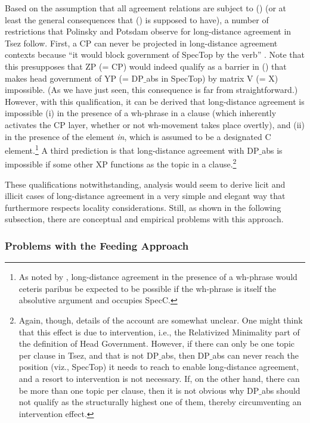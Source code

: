 \documentclass[output=paper
,modfonts
,nonflat]{langsci/langscibook}
\begin{document}
Based on the assumption that all agreement relations are subject to
(\LLast) (or at least the general consequences that (\LLast) is supposed
to have), a number of restrictions that Polinsky and Potsdam observe for
long-distance agreement in Tsez follow. First, a CP can never be
projected in long-distance agreement contexts because ``it would block
government of SpecTop by the verb''
\citep[638]{Polinsky&Potsdam:01}. Note  that this presupposes that
ZP (= CP) would indeed qualify as a barrier in (\Last) that makes
head government of YP (= DP$\_${abs} in SpecTop) by matrix V (= X)
impossible. (As we have just seen, this consequence is far from
straightforward.) However, with this qualification, it can be derived
that long-distance agreement is impossible (i) in the presence of a
wh-phrase in a clause (which inherently activates the CP layer,
whether or not wh-movement takes place overtly), and (ii) in the
presence of the element {\itshape \textcrlambda in}, which is assumed to be
a designated C element.\footnote{\label{whabs}As noted by
  \citet[fn. 20]{Polinsky&Potsdam:01}, long-distance agreement in the
  presence of a 
  wh-phrase would ceteris paribus be expected to be possible if the
  wh-phrase is itself the absolutive argument and occupies SpecC.}
 A third prediction is that long-distance
agreement with DP$\_${abs} is impossible if some other XP functions as
the topic in a clause.\footnote{Again, though, details of the account
  are somewhat unclear. One might think that this effect is due to
  intervention, i.e., the Relativized Minimality part of the
  definition of Head Government. However,  if there can only be one topic per clause in
  Tsez, and that is not DP$\_${abs}, then DP$\_${abs} can never reach the
  position (viz., SpecTop) it needs to reach to enable long-distance
  agreement, and a resort to intervention is not necessary. If, on the other hand, there can be more than one topic
  per clause, then it is not obvious why DP$\_${abs} should not qualify
  as the structurally highest one of them, thereby circumventing an
  intervention effect.}

These qualifications notwithstanding, 
analysis would seem to derive licit and illicit cases of long-distance
agreement in a very simple and elegant way that furthermore respects
locality considerations. Still, as shown in the following subsection,
there are conceptual and empirical problems with this approach.


\subsubsection{Problems with the Feeding Approach}
\end{document}
